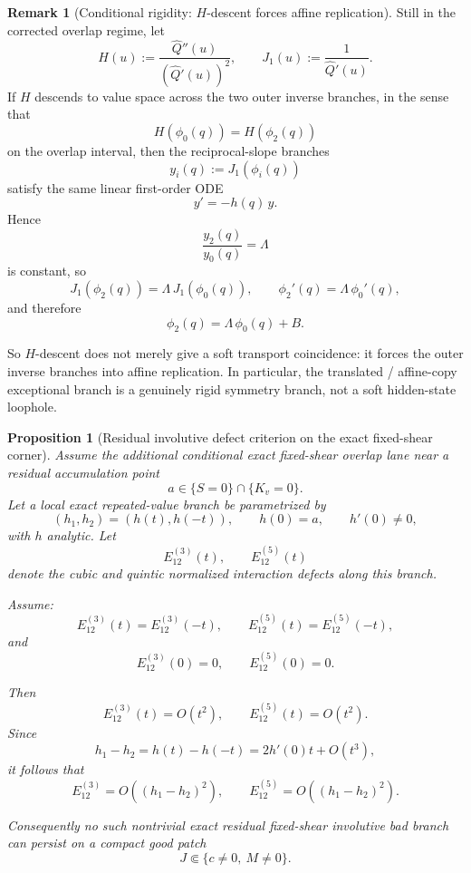 \documentclass[11pt,a4paper]{amsart}
\theoremstyle{plain}
\newtheorem{proposition}[theorem]{Proposition}
\theoremstyle{definition}
\newtheorem{remark}[theorem]{Remark}
\begin{document}
\begin{remark}[Conditional rigidity: $H$-descent forces affine replication]
\label{rem:conditional-rigidity-H-descent-forces-affine-replication}
Still in the corrected overlap regime, let
\[
H(u):=\frac{\widehat Q''(u)}{(\widehat Q'(u))^2},
\qquad
J_1(u):=\frac{1}{\widehat Q'(u)}.
\]
If $H$ descends to value space across the two outer inverse branches, in the
sense that
\[
H(\phi_0(q))=H(\phi_2(q))
\]
on the overlap interval, then the reciprocal-slope branches
\[
y_i(q):=J_1(\phi_i(q))
\]
satisfy the same linear first-order ODE
\[
y'=-h(q)\,y.
\]
Hence
\[
\frac{y_2(q)}{y_0(q)}=\Lambda
\]
is constant, so
\[
J_1(\phi_2(q))=\Lambda\,J_1(\phi_0(q)),
\qquad
\phi_2'(q)=\Lambda\,\phi_0'(q),
\]
and therefore
\[
\phi_2(q)=\Lambda\,\phi_0(q)+B.
\]

So $H$-descent does not merely give a soft transport coincidence: it forces the
outer inverse branches into affine replication. In particular, the translated /
affine-copy exceptional branch is a genuinely rigid symmetry branch, not a soft
hidden-state loophole.
\end{remark}

\begin{proposition}[Residual involutive defect criterion on the exact fixed-shear corner]
\label{prop:residual-involutive-defect-criterion-fixed-shear-corner}
Assume the additional conditional exact fixed-shear overlap lane near a residual
accumulation point
\[
a\in \{S=0\}\cap\{K_v=0\}.
\]
Let a local exact repeated-value branch be parametrized by
\[
(h_1,h_2)=(h(t),h(-t)),
\qquad
h(0)=a,
\qquad
h'(0)\neq 0,
\]
with $h$ analytic. Let
\[
E_{12}^{(3)}(t),
\qquad
E_{12}^{(5)}(t)
\]
denote the cubic and quintic normalized interaction defects along this branch.

Assume:
\[
E_{12}^{(3)}(t)=E_{12}^{(3)}(-t),
\qquad
E_{12}^{(5)}(t)=E_{12}^{(5)}(-t),
\]
and
\[
E_{12}^{(3)}(0)=0,
\qquad
E_{12}^{(5)}(0)=0.
\]

Then
\[
E_{12}^{(3)}(t)=O(t^2),
\qquad
E_{12}^{(5)}(t)=O(t^2).
\]
Since
\[
h_1-h_2=h(t)-h(-t)=2h'(0)t+O(t^3),
\]
it follows that
\[
E_{12}^{(3)}=O((h_1-h_2)^2),
\qquad
E_{12}^{(5)}=O((h_1-h_2)^2).
\]

Consequently no such nontrivial exact residual fixed-shear involutive bad
branch can persist on a compact good patch
\[
J\Subset\{c\neq 0,\ M\neq 0\}.
\]
\end{proposition}
\end{document}
